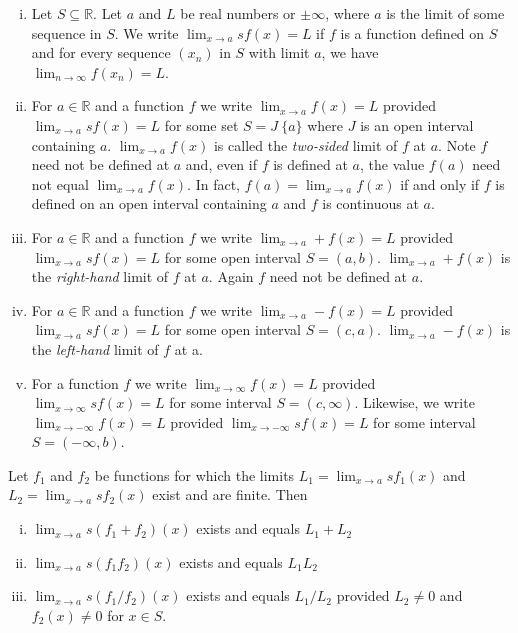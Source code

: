 \begin{defn}{1}
	\begin{enumerate}[(i)]
		\item Let $S\subseteq\mathbb{R}$. Let $a$ and $L$ be real numbers or $\pm\infty$, where $a$ is the limit of some sequence in $S$. We write $\lim_{x\rightarrow a} s f(x) = L$ if $f$ is a function defined on $S$ and for every sequence $(x_n)$ in $S$ with limit $a$, we have $\lim_{n\rightarrow \infty} f(x_n) = L$.
		\item For $a \in \mathbb{R}$ and a function $f$ we write $\lim_{x\rightarrow a} f(x) = L$ provided $\lim_{x\rightarrow a} s f(x) = L$ for some set $S = J \ \{a\}$ where $J$ is an open interval containing $a$. $\lim_{x\rightarrow a} f(x)$ is called the \textit{two-sided} limit of $f$ at $a$. Note $f$ need not be defined at $a$ and, even if $f$	is defined at $a$, the value $f (a)$ need not equal $\lim_{x\rightarrow a} f(x)$. In fact, $f (a) = \lim_{x\rightarrow a} f(x)$ if and only if $f$ is defined on an open interval containing $a$ and $f$ is continuous at $a$.
		\item For $a \in\mathbb{R}$ and a function $f$ we write $\lim_{x\rightarrow a} + f(x) = L$ provided $\lim_{x\rightarrow a} s f(x) = L$ for some open interval $S = (a, b)$. $\lim_{x\rightarrow a} + f(x)$ is the \textit{right-hand} limit of $f$ at $a$. Again $f$ need not be defined at $a$.
		\item For $a \in\mathbb{R}$ and a function $f$ we write $\lim_{x\rightarrow a} - f(x) = L$ provided $\lim_{x\rightarrow a} s f(x) = L$ for some open interval $S = (c, a)$. $\lim_{x\rightarrow a} - f(x)$ is the \textit{left-hand} limit of $f$ at a.
		\item For a function $f$ we write $\lim_{x\rightarrow \infty} f(x) = L$ provided $\lim_{x\rightarrow \infty} s f(x) = L$ for some interval $S = (c, \infty)$. Likewise,	we write $\lim_{x\rightarrow -\infty} f(x) = L$ provided $\lim_{x\rightarrow -\infty} s f(x) = L$ for some interval $S = (-\infty, b)$.
	\end{enumerate}
\end{defn}

\newpage

\begin{theo}{1}
	Let $f_1$ and $f_2$ be functions for which the limits $L_1 = \lim_{x\rightarrow a} s f_1(x)$	and $L_2 = \lim_{x\rightarrow a} s f_2(x)$ exist and are finite. Then
	\begin{enumerate}[(i)]
		\item $\lim_{x\rightarrow a} s (f_1 + f_2)(x)$ exists and equals $L_1 + L_2$
		\item $\lim_{x\rightarrow a} s (f_1 f_2 )(x)$ exists and equals $L_1 L_2$
		\item $\lim_{x\rightarrow a} s (f_1 /f_2)(x)$ exists and equals $L_1 /L_2$ provided $L_2 \neq 0$
		and $f_2(x) \neq 0$ for $x \in S$.
	\end{enumerate}
\end{theo}


